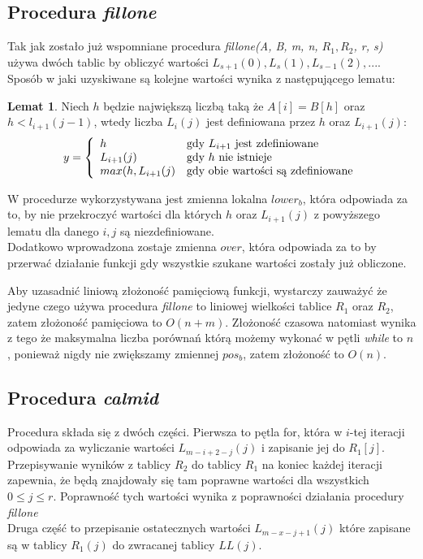 \documentclass[12pt]{article}
\theoremstyle{definition}
\theoremstyle{definition}
\theoremstyle{definition}
\newtheorem{lemma}{Lemat}[section]
\begin{document}
\subsection{Procedura \textit{fillone}}

Tak jak zostało już wspomniane procedura \textit{fillone(A, B, m, n, $R_1, R_2$, r, s)} używa dwóch tablic by obliczyć wartości $L_{s+1}(0), L_s(1), L_{s-1}(2), ...$. Sposób w jaki uzyskiwane są kolejne wartości wynika z następującego lematu:
\begin{lemma}
Niech $h$ będzie największą liczbą taką że $A[i] = B[h]$ oraz $h < l_{i+1}(j - 1)$, wtedy liczba $L_i(j)$ jest definiowana przez $h$ oraz $L_{i+1}(j)$:
$$
y = \left\{ \begin{array}{ll}
h & \textrm{gdy $ L_{i+1} $ jest zdefiniowane}\\
L_{i+1}(j) & \textrm{gdy $ h $ nie istnieje}\\
max(h, L_{i+1}(j) & \textrm{gdy obie wartości są zdefiniowane}
\end{array} \right.
$$
\end{lemma}

W procedurze wykorzystywana jest zmienna lokalna $lower_b$, która odpowiada za to, by nie przekroczyć wartości dla których $h$ oraz $L_{i+1}(j)$ z powyższego lematu dla danego $i, j$ są niezdefiniowane.\\
Dodatkowo wprowadzona zostaje zmienna $over$, która odpowiada za to by przerwać działanie funkcji gdy wszystkie szukane wartości zostały już obliczone.

Aby uzasadnić liniową złożoność pamięciową funkcji, wystarczy zauważyć że jedyne czego używa procedura \textit{fillone} to liniowej wielkości tablice $R_1$ oraz $R_2$, zatem złożoność pamięciowa to $O(n + m)$.
Złożoność czasowa natomiast wynika z tego że maksymalna liczba porównań którą możemy wykonać w pętli \textit{while} to $n$, ponieważ nigdy nie zwiększamy zmiennej $pos_b$, zatem złożoność to $O(n)$.

\subsection{Procedura \textit{calmid}}

Procedura składa się z dwóch części. Pierwsza to pętla for, która w $i$-tej iteracji odpowiada za wyliczanie wartości $L_{m-i+2-j}(j)$ i zapisanie jej do $R_1[j]$. Przepisywanie wyników z tablicy $R_2$ do tablicy $R_1$ na koniec każdej iteracji zapewnia, że będą znajdowały się tam poprawne wartości dla wszystkich $0 \leq j \leq r$. Poprawność tych wartości wynika z poprawności działania procedury \textit{fillone} \\
Druga część to przepisanie ostatecznych wartości $L_{m-x-j+1}(j)$ które zapisane są w tablicy $R_1(j)$ do zwracanej tablicy $LL(j)$.\\
\end{document}
